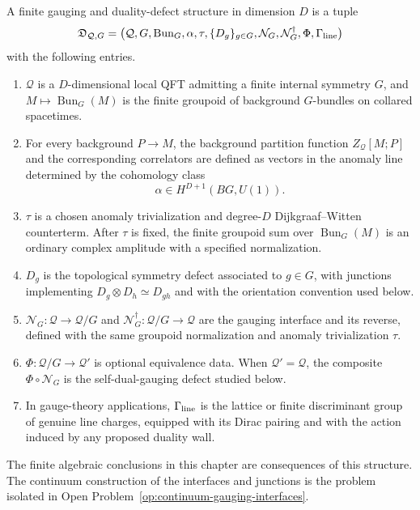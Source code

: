 \begin{hypothesis}
\label{hyp:finite-gauging-duality-defect-datum}
A finite gauging and duality-defect structure in dimension \(D\) is a tuple
\[
  \mathfrak D_{\mathcal Q,G}
  =
  \bigl(
    \mathcal Q,G,\operatorname{Bun}_G,
    \alpha,\tau,\{D_g\}_{g\in G},
    \mathcal N_G,\mathcal N_G^\dagger,
    \Phi,\Gamma_{\rm line}
  \bigr)
\]
with the following entries.
\begin{enumerate}[label=\textnormal{(\roman*)}]
\item \(\mathcal Q\) is a \(D\)-dimensional local QFT admitting a finite
  internal symmetry \(G\), and
  \(M\mapsto\operatorname{Bun}_G(M)\) is the finite groupoid of background
  \(G\)-bundles on collared spacetimes.
\item For every background \(P\to M\), the background partition function
  \(Z_{\mathcal Q}[M;P]\) and the corresponding correlators are defined as
  vectors in the anomaly line determined by the cohomology class
  \[
    \alpha\in H^{D+1}(BG,U(1)).
  \]
\item \(\tau\) is a chosen anomaly trivialization and degree-\(D\)
  Dijkgraaf--Witten counterterm.  After \(\tau\) is fixed, the finite
  groupoid sum over \(\operatorname{Bun}_G(M)\) is an ordinary complex
  amplitude with a specified normalization.
\item \(D_g\) is the topological symmetry defect associated to
  \(g\in G\), with junctions implementing
  \(D_g\otimes D_h\simeq D_{gh}\) and with the orientation convention used
  below.
\item \(\mathcal N_G:\mathcal Q\to\mathcal Q/G\) and
  \(\mathcal N_G^\dagger:\mathcal Q/G\to\mathcal Q\) are the gauging
  interface and its reverse, defined with the same groupoid normalization
  and anomaly trivialization \(\tau\).
\item \(\Phi:\mathcal Q/G\to\mathcal Q'\) is optional equivalence data.
  When \(\mathcal Q'=\mathcal Q\), the composite
  \(\Phi\circ\mathcal N_G\) is the self-dual-gauging defect studied below.
\item In gauge-theory applications, \(\Gamma_{\rm line}\) is the lattice or
  finite discriminant group of genuine line charges, equipped with its Dirac
  pairing and with the action induced by any proposed duality wall.
\end{enumerate}
The finite algebraic conclusions in this chapter are consequences of this
structure.  The continuum construction of the interfaces and junctions is the
problem isolated in
Open Problem~\ref{op:continuum-gauging-interfaces}.
\end{hypothesis}

